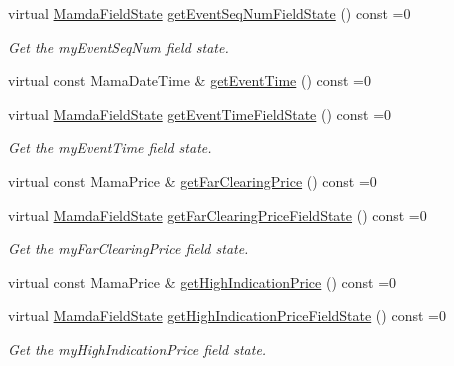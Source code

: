 \begin{CompactItemize}
virtual \hyperlink{namespaceWombat_93aac974f2ab713554fd12a1fa3b7d2a}{Mamda\-Field\-State} \hyperlink{classWombat_1_1MamdaOrderImbalanceUpdate_a27a3b4da03381d79a52f6f0d92ff76c}{get\-Event\-Seq\-Num\-Field\-State} () const =0
\begin{CompactList}\small\item\em Get the my\-Event\-Seq\-Num field state. \item\end{CompactList}\item 
virtual const Mama\-Date\-Time \& \hyperlink{classWombat_1_1MamdaOrderImbalanceUpdate_b2468935aefaa514c68cd2722addc9ba}{get\-Event\-Time} () const =0
\item 
virtual \hyperlink{namespaceWombat_93aac974f2ab713554fd12a1fa3b7d2a}{Mamda\-Field\-State} \hyperlink{classWombat_1_1MamdaOrderImbalanceUpdate_ba5f05bfc7bc6b771c670b9184db39d0}{get\-Event\-Time\-Field\-State} () const =0
\begin{CompactList}\small\item\em Get the my\-Event\-Time field state. \item\end{CompactList}\item 
virtual const Mama\-Price \& \hyperlink{classWombat_1_1MamdaOrderImbalanceUpdate_ddb07f37f8b0c39af4014e6246a7c854}{get\-Far\-Clearing\-Price} () const =0
\item 
virtual \hyperlink{namespaceWombat_93aac974f2ab713554fd12a1fa3b7d2a}{Mamda\-Field\-State} \hyperlink{classWombat_1_1MamdaOrderImbalanceUpdate_cc4cf8bd45eb1af821b968df791b0dd2}{get\-Far\-Clearing\-Price\-Field\-State} () const =0
\begin{CompactList}\small\item\em Get the my\-Far\-Clearing\-Price field state. \item\end{CompactList}\item 
virtual const Mama\-Price \& \hyperlink{classWombat_1_1MamdaOrderImbalanceUpdate_dab7a8dbc6e204f1d9221a386b4dceb6}{get\-High\-Indication\-Price} () const =0
\item 
virtual \hyperlink{namespaceWombat_93aac974f2ab713554fd12a1fa3b7d2a}{Mamda\-Field\-State} \hyperlink{classWombat_1_1MamdaOrderImbalanceUpdate_62190442d565a91c1712856f028bc6c8}{get\-High\-Indication\-Price\-Field\-State} () const =0
\begin{CompactList}\small\item\em Get the my\-High\-Indication\-Price field state. \item\end{CompactList}\item 

\end{CompactItemize}
